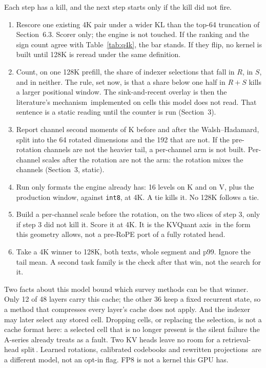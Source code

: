 \documentclass[10pt,twocolumn]{article}
\begin{document}
Each step has a kill, and the next step starts only if the kill did not fire.

\begin{enumerate}
\item Rescore one existing 4K pair under a wider KL than the top-64 truncation of Section~6.3. Scorer only; the engine is not touched. If the ranking and the sign count agree with Table~\ref{tab:q4k}, the bar stands. If they flip, no kernel is built until 128K is reread under the same definition.
\item Count, on one 128K prefill, the share of indexer selections that fall in $R$, in $S$, and in neither. The rule, set now, is that a share below one half in $R{+}S$ kills a larger positional window. The sink-and-recent overlay is then the literature's mechanism\,\cite{kivi,skvq,intactkv,rotatekv} implemented on cells this model does not read. That sentence is a static reading until the counter is run (Section~3).
\item Report channel second moments of K before and after the Walsh--Hadamard, split into the 64 rotated dimensions and the 192 that are not. If the pre-rotation channels are not the heavier tail, a per-channel arm is not built. Per-channel scales after the rotation are not the arm: the rotation mixes the channels (Section~3, static).
\item Run only formats the engine already has: 16 levels on K and on V, plus the production window, against \texttt{int8}, at 4K. A tie kills it. No 128K follows a tie.
\item Build a per-channel scale before the rotation, on the two slices of step 3, only if step 3 did not kill it. Score it at 4K. It is the KVQuant axis\,\cite{kvquant} in the form this geometry allows, not a pre-RoPE port of a fully rotated head.
\item Take a 4K winner to 128K, both texts, whole segment and p99. Ignore the tail mean. A second task family is the check after that win, not the search for it.
\end{enumerate}

Two facts about this model bound which survey methods can be that winner. Only 12 of 48 layers carry this cache; the other 36 keep a fixed recurrent state, so a method that compresses every layer's cache does not apply. And the indexer may later select any stored cell. Dropping cells, or replacing the selection, is not a cache format here: a selected cell that is no longer present is the silent failure the A-series already treats as a fault. Two KV heads leave no room for a retrieval-head split\,\cite{duoattn,razorattn}. Learned rotations, calibrated codebooks and rewritten projections\,\cite{spinquant,palu} are a different model, not an opt-in flag. FP8 is not a kernel this GPU has.
\end{document}

